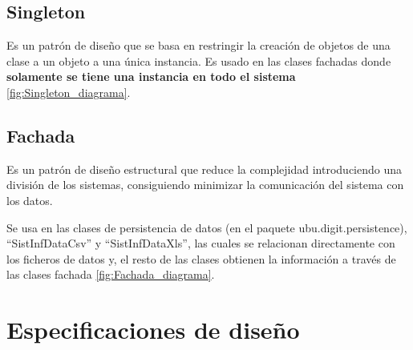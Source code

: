 \subsection{Singleton}
Es un patrón de diseño que se basa en restringir la creación de objetos de una clase a un objeto a una única instancia. Es usado en las clases fachadas donde \textbf{solamente se tiene una instancia en todo el sistema} \ref{fig:Singleton_diagrama}.


\subsection{Fachada}
Es un patrón de diseño estructural que reduce la complejidad introduciendo una división de los sistemas, consiguiendo minimizar la comunicación del sistema con los datos. 

Se usa en las clases de persistencia de datos (en el paquete ubu.digit.persistence), ``SistInfDataCsv'' y ``SistInfDataXls'', las cuales se relacionan directamente con los ficheros de datos y, el resto de las clases obtienen la información a través de las clases fachada \ref{fig:Fachada_diagrama}.


\section{Especificaciones de diseño}

